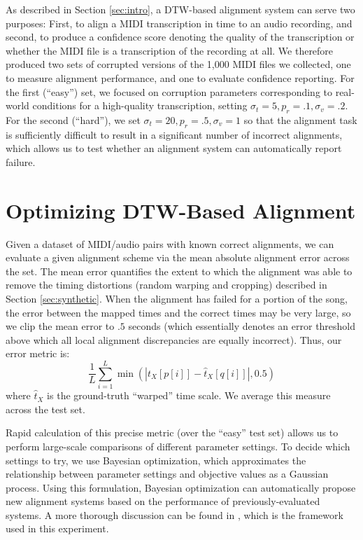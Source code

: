\documentclass{article}
\begin{document}
As described in Section \ref{sec:intro}, a DTW-based alignment system can serve two purposes: First, to align a MIDI transcription in time to an audio recording, and second, to produce a confidence score denoting the quality of the transcription or whether the MIDI file is a transcription of the recording at all.
We therefore produced two sets of corrupted versions of the 1,000 MIDI files we collected, one to measure alignment performance, and one to evaluate confidence reporting.
For the first (``easy'') set, we focused on corruption parameters corresponding to real-world conditions for a high-quality transcription, setting $\sigma_t = 5, p_r = .1, \sigma_v = .2$.
For the second (``hard''), we set $\sigma_t = 20, p_r = .5, \sigma_v = 1$ so that the alignment task is sufficiently difficult to result in a significant number of incorrect alignments, which allows us to test whether an alignment system can automatically report failure.

\section{Optimizing DTW-Based Alignment}
\label{sec:optimizing}

Given a dataset of MIDI/audio pairs with known correct alignments, we can evaluate a given alignment scheme via the mean absolute alignment error across the set.
The mean error quantifies the extent to which the alignment was able to remove the timing distortions (random warping and cropping) described in Section \ref{sec:synthetic}.
When the alignment has failed for a portion of the song, the error between the mapped times and the correct times may be very large, so we clip the mean error to $.5$ seconds (which essentially denotes an error threshold above which all local alignment discrepancies are equally incorrect).  Thus, our error metric is:
$$
\frac{1}{L}\sum_{i = 1}^{L} \min(|t_X[p[i]] - \hat{t}_X[q[i]]|, 0.5)
$$
where $\hat{t}_X$ is the ground-truth ``warped'' time scale.  We average this measure across the test set.

Rapid calculation of this precise metric (over the ``easy'' test set) allows us to perform large-scale comparisons of different parameter settings.
To decide which settings to try, we use Bayesian optimization, which approximates the relationship between parameter settings and objective values as a Gaussian process.
Using this formulation, Bayesian optimization can automatically propose new alignment systems based on the performance of previously-evaluated systems.
A more thorough discussion can be found in \cite{snoek2012practical}, which is the framework used in this experiment.
\end{document}
